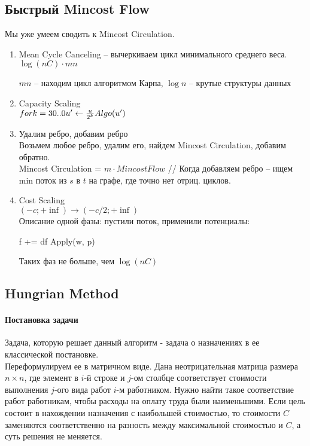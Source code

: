 \subsection{Быстрый Mincost Flow}
Мы уже умеем сводить к Mincost Circulation.\\
\begin{enumerate}
	\item Mean Cycle Canceling -- вычеркиваем цикл минимального среднего веса.\\
	$\log (nC) \cdot mn$ 
	
	$mn$ -- находим цикл алгоритмом Карпа, $\log n$ -- крутые структуры данных
	\item Capacity Scaling \\
	$for k = 30..0\\
	u' \gets \frac{u}{2^k}\\
	Algo(u')$ 
	\item Удалим ребро, добавим ребро\\
	Возьмем любое ребро, удалим его, найдем Mincost Circulation, добавим обратно.\\
	Mincost Circulation = $m\cdot Mincost Flow$ // Когда добавляем ребро -- ищем min поток из $s$ в $t$ на графе, где точно нет отриц. циклов.
	\item Cost Scaling\\
	$(-c; +\inf) \to (-c/2; +\inf)$\\
	Описание одной фазы: пустили поток, применили потенциалы:
	\begin{cppcode}
	f += df
	Apply(w, p)
	\end{cppcode}
	\begin{lemma}
	Таких фаз не больше, чем $\log(nC)$
	\end{lemma} 
\end{enumerate}

\subsection{Hungrian Method}
\paragraph{Постановка задачи}
Задача, которую решает данный алгоритм - задача о назначениях в ее классической постановке.\\
Переформулируем ее в матричном виде. Дана неотрицательная матрица размера $n × n$, где элемент в $i$-й строке и $j$-ом столбце соответствует стоимости выполнения $j$-ого вида работ $i$-м работником. Нужно 
найти такое соответствие работ работникам, чтобы расходы на оплату труда были наименьшими. Если цель состоит в нахождении назначения с наибольшей стоимостью, то стоимости $C$ заменяются соответственно на разность 
между максимальной стоимостью и $C$, а суть решения не меняется.\\
